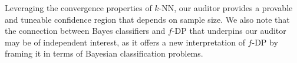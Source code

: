 Leveraging the convergence properties of $k$-NN, our auditor provides a provable and tuneable confidence region that depends on sample size. We also note that the connection between Bayes classifiers and $f$-DP that underpins our auditor may be of independent interest, as it offers a new interpretation of $f$-DP by framing it in terms of Bayesian classification problems.




